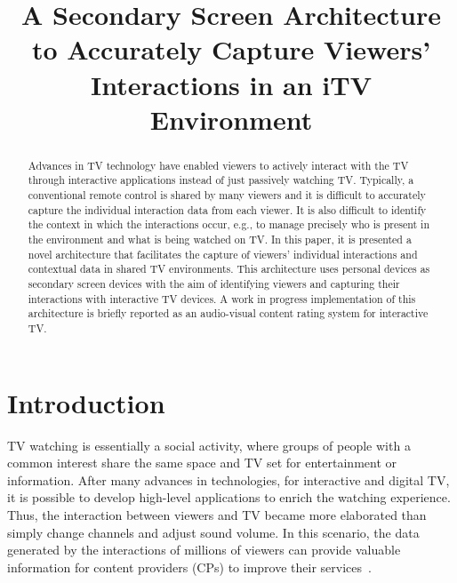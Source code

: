 \documentclass[conference,a4paper]{IEEEtran}
\begin{document}
\title{A Secondary Screen Architecture to Accurately Capture Viewers' Interactions in an iTV Environment}

\author{
\and
{}
}
\maketitle

\begin{abstract}
Advances in TV technology have enabled viewers to actively interact with the TV through interactive applications instead of just passively watching TV. Typically, a conventional remote control is shared by many viewers and it is difficult to accurately capture the individual interaction data from each viewer. It is also difficult to identify the context in which the interactions occur, e.g., to manage precisely who is present in the environment and what is being watched on TV. In this paper, it is presented a novel architecture that facilitates the capture of viewers' individual interactions and contextual data in shared TV environments. This architecture uses personal devices as secondary screen devices with the aim of identifying viewers and capturing their interactions with interactive TV devices. A work in progress implementation of this architecture is briefly reported as an audio-visual content rating system for interactive TV.
\end{abstract}

\IEEEpeerreviewmaketitle

\section{Introduction}

TV watching is essentially a social activity, where groups of people with a common interest share the same space and TV set for entertainment or information. After many advances in technologies, for interactive and digital TV, it is possible to develop high-level applications to enrich the watching experience. Thus, the interaction between viewers and TV became more elaborated than simply change channels and adjust sound volume. In this scenario, the data generated by the interactions of millions of viewers can provide valuable information for content providers (CPs) to improve their services~\cite{Teixeira2010}.
\end{document}
